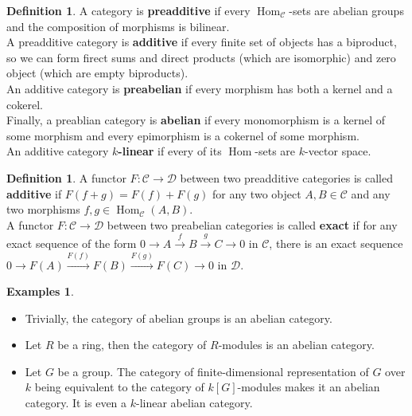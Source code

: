 \documentclass{article}
\theoremstyle{plain}
\theoremstyle{definition}
\newtheorem{definition}[theorem]{Definition}
\newtheorem{examples}[theorem]{Examples}
\DeclareMathOperator{\Hom}{Hom}
\begin{document}
\begin{definition}
    A category is \textbf{preadditive} if every $\Hom_{\mathcal{C}}$-sets are abelian groups and the composition of morphisms is bilinear.\\
    A preadditive category is \textbf{additive} if every finite set of objects has a biproduct, so we can form firect sums and direct products (which are isomorphic) and zero object (which are empty biproducts).\\
    An additive category is \textbf{preabelian} if every morphism has both a kernel and a cokerel.\\
    Finally, a preablian category is \textbf{abelian} if every monomorphism is a kernel of some morphism and every epimorphism is a cokernel of some morphism.\\
    An additive category \textbf{$k$-linear} if every of its $\Hom$-sets are $k$-vector space.
\end{definition}



\begin{definition}
    A functor $F:\mathcal{C}\rightarrow\mathcal{D}$ between two preadditive categories is called \textbf{additive} if $F(f+g) = F(f)+F(g)$ for any two object $A,B\in\mathcal{C}$ and any two morphisms $f,g\in\Hom_{\mathcal{C}}(A,B)$.\\
    A functor $F:\mathcal{C}\rightarrow\mathcal{D}$ between two preabelian categories is called  \textbf{exact} if for any exact sequence of the form
    $0\rightarrow A \xrightarrow{f} B\xrightarrow{g}C\rightarrow 0$
    in $\mathcal{C}$, there is an exact sequence $0\rightarrow F(A) \xrightarrow{F(f)} F(B)\xrightarrow{F(g)}F(C)\rightarrow 0$ in $\mathcal{D}$.
\end{definition}

\begin{examples}\textbf{ }
\begin{itemize}
    \item[$a)$] Trivially, the category of abelian groups is an abelian category.
    \item[$b)$] Let $R$ be a ring, then the category of $R$-modules is an abelian category.
    \item[$c)$] Let $G$ be a group. The category of finite-dimensional representation of $G$ over $k$ being equivalent to the category of $k[G]$-modules makes it an abelian category.
    It is even a $k$-linear abelian category.
\end{itemize}
\end{examples}
\end{document}
